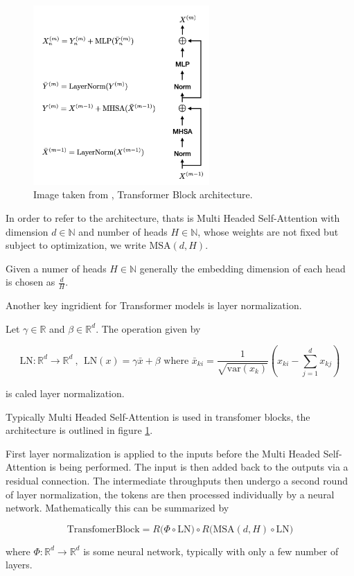 \begin{figure}[h!]
    \includegraphics[width=0.6\textwidth]{models/preliminaries/imgs/transformer-block.png}
    \caption{Image taken from \cite{turnerIntroductionTransformers2024}, Transformer Block architecture.}
    \label{fig:transformer_block}
\end{figure}

In order to refer to the architecture,
thats is Multi Headed Self-Attention with dimension $d \in \mathbb N$ and number of heads $H \in \mathbb N$,
whose weights are not fixed but subject to optimization, 
we write $\text{MSA}(d, H)$.

Given a numer of heads $H \in \mathbb N$ generally the embedding dimension of each head is chosen as $\frac{d}{H}$.

Another key ingridient for Transformer models is layer normalization.

\begin{definition}
    Let $\gamma \in \mathbb R$ and $\beta \in \mathbb R^d$. The operation given by

        $$\text{LN} : \mathbb R^d \to \mathbb R^d ~, ~~ 
        \text{LN}(x) = \gamma \bar{x} + \beta 
        \text{ where } \bar{x}_{ki} = \frac{1}{\sqrt{\text{var}(x_{k})}} (x_{ki} - \sum_{j=1}^d x_{kj})$$

    is caled layer normalization.
\end{definition}

Typically Multi Headed Self-Attention is used in transfomer blocks,
the architecture is outlined in figure \ref{fig:transformer_block}.

First layer normalization is applied to the inputs before the Multi Headed Self-Attention is being performed.
The input is then added back to the outputs via a residual connection.
The intermediate throughputs then undergo a second round of layer normalization, 
the tokens are then processed individually by a neural network.
Mathematically this can be summarized by

\begin{equation*}
    \text{TransfomerBlock} = R \big( \Phi \circ \text{LN} \big) \circ R \big( \text{MSA}(d, H) \circ \text{LN} \big)
\end{equation*}

where $\Phi: \mathbb{R}^d \to \mathbb{R}^d$ is some neural network, typically with only a few number of layers.